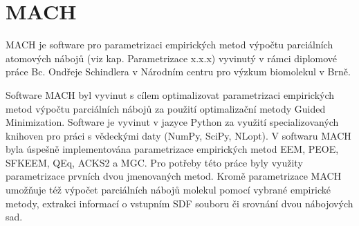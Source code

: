 \section{MACH}
MACH je software pro parametrizaci empirických metod výpočtu parciálních atomových nábojů (viz kap. Parametrizace x.x.x) vyvinutý v rámci diplomové práce Bc. Ondřeje Schindlera v Národním centru pro výzkum biomolekul v Brně. 

Software MACH byl vyvinut s cílem optimalizovat parametrizaci empirických metod výpočtu parciálních nábojů za použití optimalizační metody Guided Minimization. Software je vyvinut v jazyce Python za využití specializovaných knihoven pro práci s vědeckými daty (NumPy, SciPy, NLopt). V softwaru MACH byla úspešně implementována parametrizace empirických metod EEM, PEOE, SFKEEM, QEq, ACKS2 a MGC. Pro potřeby této práce byly využity parametrizace prvních dvou jmenovaných metod. Kromě parametrizace MACH umožňuje též výpočet parciálních nábojů molekul pomocí vybrané empirické metody, extrakci informací o vstupním SDF souboru či srovnání dvou nábojových sad.

